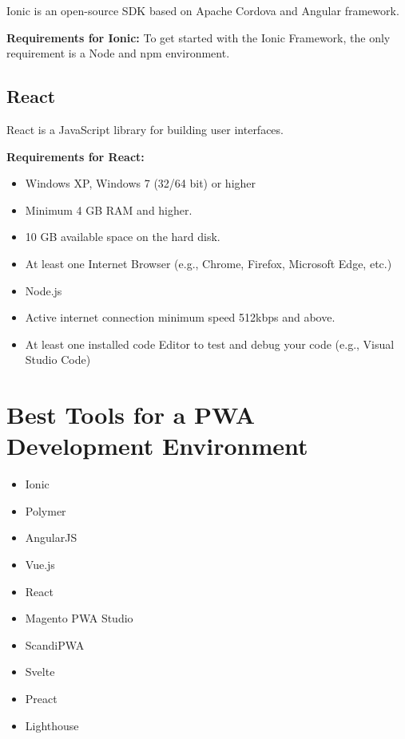 \documentclass{IEEEtran}
\begin{document}
	Ionic is an open-source SDK based on Apache Cordova and Angular framework.
	
	\textbf{Requirements for Ionic:}
	To get started with the Ionic Framework, the only requirement is a Node and npm environment.
	
	\subsection{React}
	
	React is a JavaScript library for building user interfaces.
	
	\textbf{Requirements for React:}
	\begin{itemize}
		\item Windows XP, Windows 7 (32/64 bit) or higher
		\item Minimum 4 GB RAM and higher.
		\item 10 GB available space on the hard disk.
		\item At least one Internet Browser (e.g., Chrome, Firefox, Microsoft Edge, etc.)
		\item Node.js
		\item Active internet connection minimum speed 512kbps and above.
		\item At least one installed code Editor to test and debug your code (e.g., Visual Studio Code)
	\end{itemize}
	
	\section{Best Tools for a PWA Development Environment}
	
	\begin{itemize}
		\item Ionic
		\item Polymer
		\item AngularJS
		\item Vue.js
		\item React
		\item Magento PWA Studio
		\item ScandiPWA
		\item Svelte 
		\item Preact 
		\item Lighthouse 
	\end{itemize}
\end{document}
